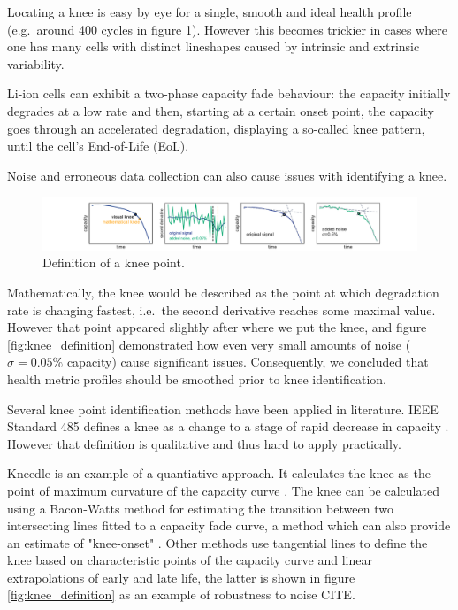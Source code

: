 \documentclass{article}
\begin{document}
Locating a knee is easy by eye for a single, smooth and ideal health profile (e.g.\ around 400 cycles in figure 1). However this becomes trickier in cases where one has many cells with distinct lineshapes caused by intrinsic and extrinsic variability. 

Li-ion cells can exhibit a two-phase capacity fade behaviour: the capacity initially degrades at a low rate and then, starting at a certain onset point, the capacity goes through an accelerated degradation, displaying a so-called knee pattern, until the cell’s End-of-Life (EoL). 

Noise and erroneous data collection can also cause issues with identifying a knee.

\begin{figure}[ht]
\centering
\includegraphics[width=\textwidth]{images/knee_definition.pdf}
\caption{Definition of a knee point.}
\label{fig:knee_definition3}
\end{figure}

Mathematically, the knee would be described as the point at which degradation rate is changing fastest, i.e.\ the second derivative reaches some maximal value. However that point appeared slightly after where we put the knee, and figure \ref{fig:knee_definition} demonstrated how even very small amounts of noise ($\sigma=0.05\%$ capacity) cause significant issues. Consequently, we concluded that health metric profiles should be smoothed prior to knee identification.

Several knee point identification methods have been applied in literature. IEEE Standard 485 defines a knee as a change to a stage of rapid decrease in capacity \cite{noauthor_ieee_2011}. However that definition is qualitative and thus hard to apply practically.

Kneedle is an example of a quantiative approach. It calculates the knee as the point of maximum curvature of the capacity curve \cite{satopaa_finding_2011}. The knee can be calculated using a Bacon-Watts method for estimating the transition between two intersecting lines fitted to a capacity fade curve, a method which can also provide an estimate of "knee-onset" \cite{fermin-cueto_identification_2020}. Other methods use tangential lines to define the knee based on characteristic points of the capacity curve \cite{diao_algorithm_2019} and linear extrapolations of early and late life, the latter is shown in figure \ref{fig:knee_definition} as an example of robustness to noise CITE.
\end{document}
